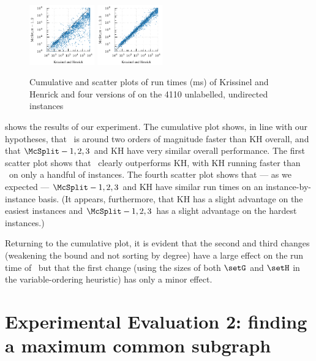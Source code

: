 \begin{figure}[htb]
{        \includegraphics*[width=0.25\textwidth]{14-mcsplit-i-undirected/krissinel/mcs-instances-experiment/plots/kh-vs-mcsplit-2}
        \includegraphics*[width=0.25\textwidth]{14-mcsplit-i-undirected/krissinel/mcs-instances-experiment/plots/kh-vs-mcsplit-3}
        \label{figure:kh-plain-cumulative}
    }
    \caption{Cumulative and scatter plots of run times (ms) of Krissinel and Henrick \cite{DBLP:journals/spe/KrissinelH04}
            and four versions of \McSplit on the 4110 unlabelled, undirected instances}\label{fig:mcsplit-vs-kh}
\end{figure}

 shows the results of our experiment.  The cumulative plot shows,
in line with our hypotheses,
that \McSplit\ is around two orders of magnitude faster than KH overall, and that
$\McSplit - 1,2,3$ and KH have very similar overall performance.  The first scatter
plot shows that \McSplit\ clearly outperforms KH, with KH running faster than \McSplit\
on only a handful of instances.  The fourth scatter plot shows that --- as we expected ---
$\McSplit - 1,2,3$ and KH have similar run times on an instance-by-instance basis.
(It appears, furthermore, that
KH has a slight advantage on the easiest instances and
$\McSplit - 1,2,3$ has a slight advantage on the hardest instances.)

Returning to the cumulative plot, it is evident that the second and third changes (weakening
the bound and not sorting by degree) have a large effect on the run time of \McSplit\,
but that the first change (using the sizes of both $\setG$ and $\setH$ in the variable-ordering
heuristic) has only a minor effect.

\FloatBarrier

\section{Experimental Evaluation 2: finding a maximum common subgraph}
\label{sec:mcsplit-experiments}

